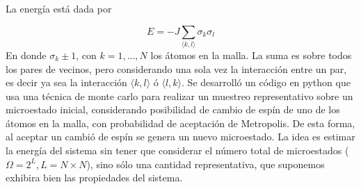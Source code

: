 \documentclass[a4paper,12pt]{article}
\begin{document}
   \noindent La energía está dada por

   \begin{equation}
     E = -J\sum_{\langle k,l \rangle}\sigma_{k} \sigma_{l}
   \end{equation}
   \noindent En donde $\sigma_{k} \pm 1$, con $k = 1,...,N$ los átomos en la malla. La suma es sobre todos los pares de vecinos, pero considerando una sola vez la interacción entre un par, es decir ya sea la interacción $\langle k, l \rangle$ ó $\langle l,k \rangle$. Se desarrolló un código en python que usa una técnica de monte carlo para realizar un muestreo representativo sobre un microestado inicial, considerando posibilidad de cambio de espín de uno de los átomos en la malla, con probabilidad de aceptación de Metropolis. De esta forma, al aceptar un cambió de espín se genera un nuevo microestado. La idea es estimar la energía del sistema sin tener que considerar el número total de microestados ($\Omega = 2^L, L = N \times N$), sino sólo una cantidad representativa, que suponemos exhibira bien las propiedades del sistema. 
   
\end{document}
